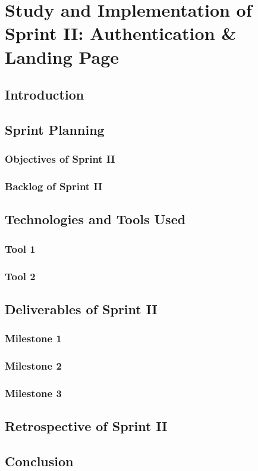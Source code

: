 \documentclass[a4paper,12pt]{report}
\begin{document}
\chapter{Study and Implementation of Sprint II: Authentication \& Landing Page}

\section{Introduction}
\section{Sprint Planning}
\subsection{Objectives of Sprint II}
\subsection{Backlog of Sprint II}
\section{Technologies and Tools Used}
\subsection{Tool 1}
\subsection{Tool 2}
\section{Deliverables of Sprint II}
\subsection{Milestone 1}
\subsection{Milestone 2}
\subsection{Milestone 3}
\section{Retrospective of Sprint II}
\section{Conclusion}
\end{document}

